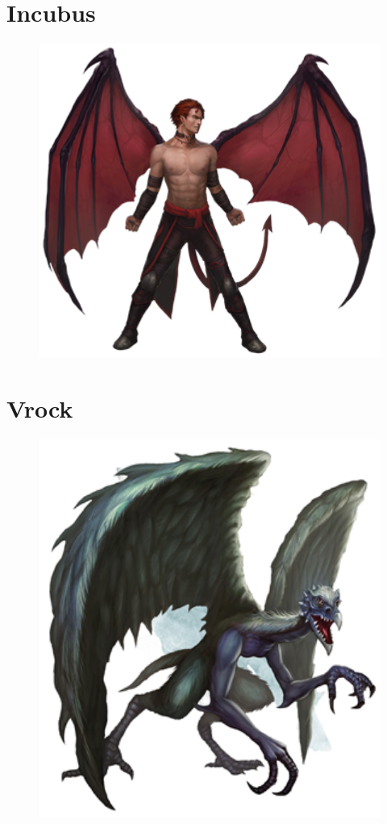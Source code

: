 \documentclass[oneside]{clgrammar}
\begin{document}
\newpage

\section{Incubus}
\begin{figure}[h!]
\centering
\includegraphics[width=350pt]{images/monstros/incubos.png}
\end{figure}

\newpage

\section{Vrock}
\begin{figure}[h!]
\centering
\includegraphics[width=350pt]{images/monstros/crock-removebg-preview.png}
\end{figure}
\end{document}
